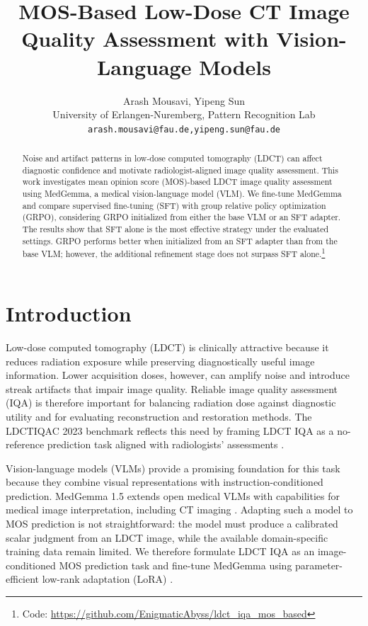 \documentclass[10pt,twocolumn,letterpaper]{article}
\title{MOS-Based Low-Dose CT Image Quality Assessment with Vision-Language Models}
\author{
Arash Mousavi, Yipeng Sun\\
University of Erlangen-Nuremberg, Pattern Recognition Lab\\[0.5em]
\texttt{arash.mousavi@fau.de,yipeng.sun@fau.de}
}
\begin{document}
\maketitle

\begin{abstract}
Noise and artifact patterns in low-dose computed tomography (LDCT) can affect diagnostic confidence and motivate radiologist-aligned image quality assessment. This work investigates mean opinion score (MOS)-based LDCT image quality assessment using MedGemma, a medical vision-language model (VLM). We fine-tune MedGemma and compare supervised fine-tuning (SFT) with group relative policy optimization (GRPO), considering GRPO initialized from either the base VLM or an SFT adapter. The results show that SFT alone is the most effective strategy under the evaluated settings. GRPO performs better when initialized from an SFT adapter than from the base VLM; however, the additional refinement stage does not surpass SFT alone.\footnote{Code: \url{https://github.com/EnigmaticAbyss/ldct_iqa_mos_based}}
\end{abstract}


\section{Introduction}
Low-dose computed tomography (LDCT) is clinically attractive because it reduces radiation exposure while preserving diagnostically useful image information. Lower acquisition doses, however, can amplify noise and introduce streak artifacts that impair image quality. Reliable image quality assessment (IQA) is therefore important for balancing radiation dose against diagnostic utility and for evaluating reconstruction and restoration methods. The LDCTIQAC 2023 benchmark reflects this need by framing LDCT IQA as a no-reference prediction task aligned with radiologists' assessments \cite{lee2025low}.

Vision-language models (VLMs) provide a promising foundation for this task because they combine visual representations with instruction-conditioned prediction. MedGemma 1.5 extends open medical VLMs with capabilities for medical image interpretation, including CT imaging \cite{sellergren2026medgemma}. Adapting such a model to MOS prediction is not straightforward: the model must produce a calibrated scalar judgment from an LDCT image, while the available domain-specific training data remain limited. We therefore formulate LDCT IQA as an image-conditioned MOS prediction task and fine-tune MedGemma using parameter-efficient low-rank adaptation (LoRA) \cite{hu2022lora}.
\end{document}
